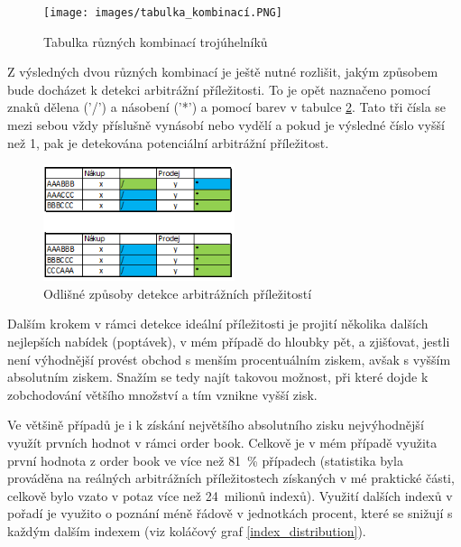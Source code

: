 \documentclass[thesis=B,czech]{FITthesis}[2019/03/21]
\begin{document}
\begin{figure}\centering
	\texttt{[image: images/tabulka\_kombinací.PNG]}
	\caption{Tabulka různých kombinací trojúhelníků}\label{tabulka_kombinaci}
\end{figure}
Z výsledných dvou různých kombinací je ještě nutné rozlišit, jakým způsobem bude docházet k detekci arbitrážní příležitosti. To je opět naznačeno pomocí znaků dělena ('/') a násobení ('*') a pomocí barev v tabulce \ref{2_kombinace}. Tato tři čísla se mezi sebou vždy příslušně vynásobí nebo vydělí a pokud je výsledné číslo vyšší než 1, pak je detekována potenciální arbitrážní příležitost. 

\begin{figure}\centering
	\includegraphics[width=0.5\textwidth]{images/2_kombinace.PNG}
	\caption{Odlišné způsoby detekce arbitrážních příležitostí}\label{2_kombinace}
\end{figure}
Dalším krokem v rámci detekce ideální příležitosti je projití několika dalších nejlepších nabídek (poptávek), v mém případě do hloubky pět, a zjišťovat, jestli není výhodnější provést obchod s menším procentuálním ziskem, avšak s vyšším absolutním ziskem. Snažím se tedy najít takovou možnost, při které dojde k zobchodování většího množství a tím vznikne vyšší zisk.

Ve většině případů je i k získání největšího absolutního zisku nejvýhodnější využít prvních hodnot v rámci order book. Celkově je v mém případě využita první hodnota z order book ve více než 81~\% případech (statistika byla prováděna na reálných arbitrážních příležitostech získaných v mé praktické části, celkově bylo vzato v potaz více než 24~milionů indexů). Využití dalších indexů v pořadí je využito o poznání méně řádově v jednotkách procent, které se snižují s každým dalším indexem (viz koláčový graf \ref{index_distribution}).
\end{document}
